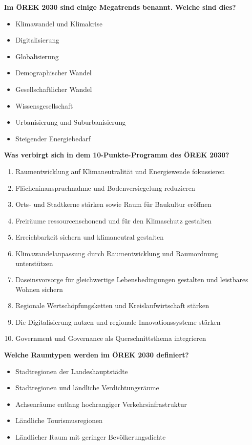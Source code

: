 \documentclass[]{article}
\newenvironment{question}{\vspace{8mm}\noindent\bfseries}{\\}
\begin{document}
\begin{question}
	Im ÖREK 2030 sind einige Megatrends benannt. Welche sind dies?
\end{question}
\begin{itemize}
	\item Klimawandel und Klimakrise
	\item Digitalisierung
	\item Globalisierung
	\item Demographischer Wandel
	\item Gesellschaftlicher Wandel
	\item Wissensgesellschaft
	\item Urbanisierung und Suburbanisierung
	\item Steigender Energiebedarf
\end{itemize}


\begin{question}
	Was verbirgt sich in dem 10-Punkte-Programm des ÖREK 2030?
\end{question}
\begin{enumerate}
	\item Raumentwicklung auf Klimaneutralität und Energiewende fokussieren
	\item Flächeninanspruchnahme und Bodenversiegelung reduzieren
	\item Orts- und Stadtkerne stärken sowie Raum für Baukultur eröffnen
	\item Freiräume ressourcenschonend und für den Klimaschutz gestalten
	\item Erreichbarkeit sichern und klimaneutral gestalten
	\item Klimawandelanpassung durch Raumentwicklung und Raumordnung unterstützen
	\item Daseinsvorsorge für gleichwertige Lebensbedingungen gestalten und leistbares Wohnen sichern
	\item Regionale Wertschöpfungsketten und Kreislaufwirtschaft stärken
	\item Die Digitalisierung nutzen und regionale Innovationssysteme stärken
	\item Government und Governance als Querschnittsthema integrieren
\end{enumerate}


\begin{question}
	Welche Raumtypen werden im ÖREK 2030 definiert?
\end{question}
\begin{itemize}
	\item Stadtregionen der Landeshauptstädte
	\item Stadtregionen und ländliche Verdichtungsräume
	\item Achsenräume entlang hochrangiger Verkehrsinfrastruktur
	\item Ländliche Tourismusregionen
	\item Ländlicher Raum mit geringer Bevölkerungsdichte
\end{itemize}
\end{document}
